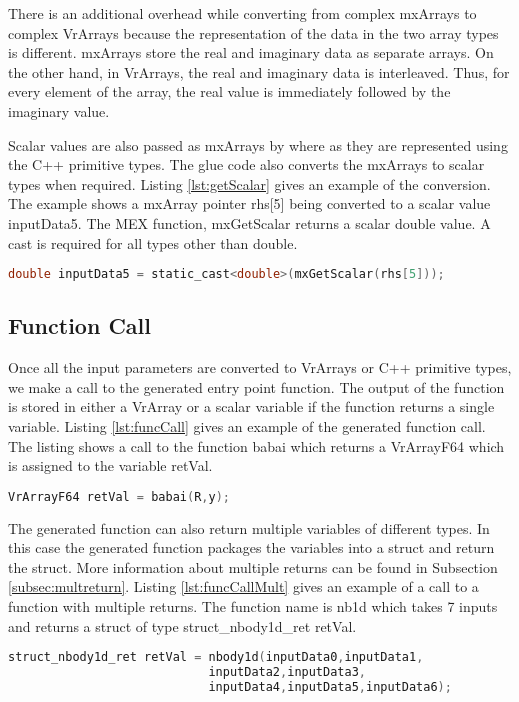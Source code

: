 There is an additional overhead while converting from complex mxArrays to complex VrArrays because the representation of the data in the two array types is different. mxArrays store the real and imaginary data as separate arrays. On the other hand, in VrArrays, the real and imaginary data is interleaved. Thus, for every element of the array, the real value is immediately followed by the imaginary value.

Scalar values are also passed as mxArrays by \matlab where as they are represented using the C++ primitive types. The glue code also converts the mxArrays to scalar types when required. Listing \ref{lst:getScalar} gives an example of the conversion. The example shows a mxArray pointer rhs[5] being converted to a scalar value inputData5. The MEX function, mxGetScalar returns a scalar double value. A cast is required for all types other than double.
\begin{lstlisting}[language=c,caption={Converting mxArrays to scalars},label={lst:getScalar}]
 double inputData5 = static_cast<double>(mxGetScalar(rhs[5]));
\end{lstlisting}

\subsection{Function Call}
Once all the input parameters are converted to VrArrays or C++ primitive types, we make a call to the generated entry point function. The output of the function is stored in either a VrArray or a scalar variable if the function returns a single variable. Listing \ref{lst:funcCall} gives an example of the generated function call. The listing shows a call to the function babai which returns a VrArrayF64 which is assigned to the variable retVal.
\begin{lstlisting}[language=c,caption={Call to generated function},label={lst:funcCall}]
VrArrayF64 retVal = babai(R,y);
\end{lstlisting}

The generated function can also return multiple variables of different types. In this case the generated function packages the  variables into a struct and return the struct. More information about multiple returns can be found in Subsection \ref{subsec:multreturn}. Listing \ref{lst:funcCallMult} gives an example of a call to a function with multiple returns. The function name is nb1d which takes 7 inputs and returns a struct of type struct\_nbody1d\_ret retVal.
\begin{lstlisting}[language=c,caption={Call to generated function},label={lst:funcCallMult}]
struct_nbody1d_ret retVal = nbody1d(inputData0,inputData1,
							inputData2,inputData3,
							inputData4,inputData5,inputData6);
\end{lstlisting}
